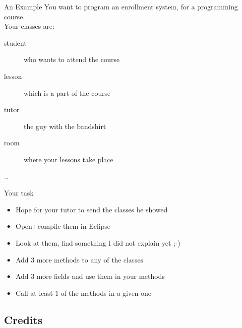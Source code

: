 \begin{frame}{An Example}
	You want to program an enrollment system, for a programming course. \\
	\vspace{1em}
	Your classes are:\\
	\begin{description}
		\item[student] who wants to attend the course
		\item[lesson] which is a part of the course
		\item[tutor] the guy with the bandshirt
		\item[room] where your lessons take place
		\item[\dots]
	\end{description}
\end{frame}

\begin{frame}{Your task}

\begin{itemize}
	\item Hope for your tutor to send the classes he showed
	\item Open+compile them in Eclipse
	\item Look at them, find something I did not explain yet ;-)
	\item Add 3 more methods to any of the classes
	\item Add 3 more fields and use them in your methods
	\item Call at least 1 of the methods in a given one
\end{itemize}

\end{frame}



\subsection{Credits}

